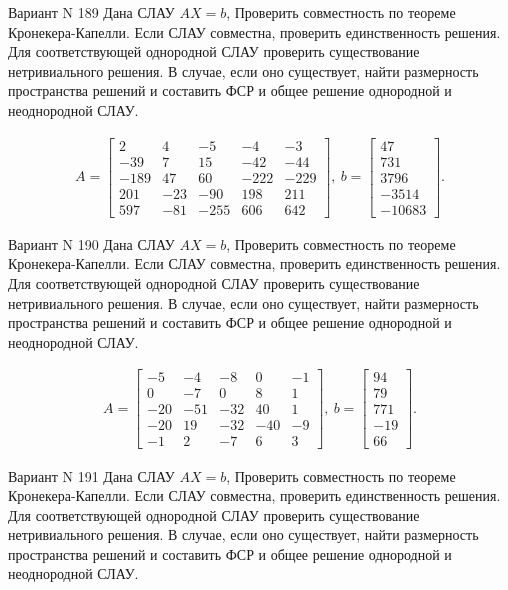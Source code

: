 \documentclass[11pt]{report}
\begin{document}
Вариант N 189
Дана СЛАУ $AX = b$,
Проверить совместность по теореме Кронекера-Капелли. Если СЛАУ совместна, проверить единственность решения.
Для соответствующей однородной СЛАУ проверить существование нетривиального решения. В случае, если оно существует,
найти размерность пространства решений и составить ФСР и общее решение однородной  и неоднородной СЛАУ.


\begin{align*}
 A = \left[\begin{matrix}2 & 4 & -5 & -4 & -3\\-39 & 7 & 15 & -42 & -44\\-189 & 47 & 60 & -222 & -229\\201 & -23 & -90 & 198 & 211\\597 & -81 & -255 & 606 & 642\end{matrix}\right],
\ b = \left[\begin{matrix}47\\731\\3796\\-3514\\-10683\end{matrix}\right]. 
 \end{align*}

Вариант N 190
Дана СЛАУ $AX = b$,
Проверить совместность по теореме Кронекера-Капелли. Если СЛАУ совместна, проверить единственность решения.
Для соответствующей однородной СЛАУ проверить существование нетривиального решения. В случае, если оно существует,
найти размерность пространства решений и составить ФСР и общее решение однородной  и неоднородной СЛАУ.


\begin{align*}
 A = \left[\begin{matrix}-5 & -4 & -8 & 0 & -1\\0 & -7 & 0 & 8 & 1\\-20 & -51 & -32 & 40 & 1\\-20 & 19 & -32 & -40 & -9\\-1 & 2 & -7 & 6 & 3\end{matrix}\right],
\ b = \left[\begin{matrix}94\\79\\771\\-19\\66\end{matrix}\right]. 
 \end{align*}

Вариант N 191
Дана СЛАУ $AX = b$,
Проверить совместность по теореме Кронекера-Капелли. Если СЛАУ совместна, проверить единственность решения.
Для соответствующей однородной СЛАУ проверить существование нетривиального решения. В случае, если оно существует,
найти размерность пространства решений и составить ФСР и общее решение однородной  и неоднородной СЛАУ.
\end{document}
